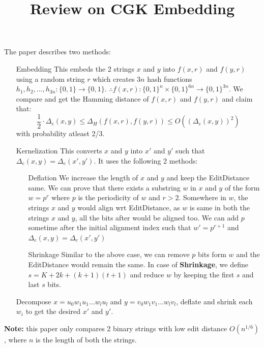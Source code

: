 \documentclass{article}
\title{Review on CGK Embedding}
\author{}
\date{}
\begin{document}
\maketitle

\noindent 
The paper describes two methods: 

\begin{enumerate}
    \item [Embedding] This embeds the 2 strings $x$ and $y$ into $f(x,r)$ and 
    $f(y,r)$ using a random string $r$ which creates $3n$ hash functions 
    $h_1,h_2,...,h_{3n}: \{0,1\} \rightarrow \{0,1\}$.
    $\therefore f(x,r): \{0,1\}^n \times \{0,1\}^{6n} \rightarrow \{0,1\}^{3n}$.
    We compare and get the Hamming distance of $f(x,r)$ and $f(y,r)$ and claim
    that:
    $$\frac{1}{2}\cdot \Delta_e(x,y) \leq \Delta_H(f(x,r),f(y,r)) \leq
    O((\Delta_e(x,y))^2)$$
    with probability atleast 2/3.

    \item [Kernelization] This converts $x$ and $y$ into $x'$ and $y'$ such 
    that $\Delta_e(x,y)=\Delta_e(x',y')$. It uses the following 2 methods:
    \begin{enumerate}
        \item [Deflation] We increase the length of $x$ and $y$ and keep the 
        EditDistance same. We can prove that there exists a substring $w$ 
        in $x$ and $y$ of the form $w=p^r$ where $p$ is the periodicity of $w$
        and $r>2$. Somewhere in $w$, the strings $x$ and $y$ would align wrt
        EditDistance, as $w$ is same in both the strings $x$ and $y$, all the 
        bits after would be aligned too. We can add $p$ sometime after the initial 
        alignment index such that $w'=p^{r+1}$ and $\Delta_e(x,y)=\Delta_e(x',y')$

        \item [Shrinkage] Similar to the above case, we can remove $p$ bits form
        $w$ and the EditDistance would remain the same. In case of 
        \textbf{Shrinkage}, we define $s=K+2k+(k+1)(t+1)$ and reduce $w$ by
        keeping the first $s$ and last $s$ bits.
    \end{enumerate}
    Decompose $x=u_0w_1u_1...w_lu_l$ and $y=v_0w_1v_1...w_lv_l$, deflate and 
    shrink each $w_i$ to get the desired $x'$ and $y'$.
\end{enumerate}

\noindent
\textbf{Note:} this paper only compares 2 binary strings with low edit distance
$O(n^{1/6})$, where $n$ is the length of both the strings.
\end{document}
